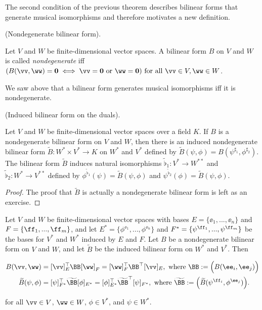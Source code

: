 The second condition of the previous theorem describes bilinear forms that generate musical isomorphisms and therefore motivates a new definition.

\begin{defn}
    (Nondegenerate bilinear form).
    
    Let $V$ and $W$ be finite-dimensional vector spaces. A bilinear form $B$ on $V$ and $W$ is called \textit{nondegenerate} iff $(B(\vv, \ww) = \mathbf{0} \iff \vv = \mathbf{0} \text{ or } \ww = \mathbf{0}) \text{ for all } \vv \in V, \ww \in W$.

    We saw above that a bilinear form generates musical isomorphisms iff it is nondegenerate.
\end{defn}

\begin{theorem}
\label{ch::bilinear_forms_metric_tensors::induced_bilinear_form_on_duals}
    (Induced bilinear form on the duals).
    
    Let $V$ and $W$ be finite-dimensional vector spaces over a field $K$. If $B$ is a nondegenerate bilinear form on $V$ and $W$, then there is an induced nondegenerate bilinear form $\widetilde{B}:W^* \times V^* \rightarrow K$ on $W^*$ and $V^*$ defined by $\widetilde{B}(\psi, \phi) = B(\psi^{\sharp_1}, \phi^{\sharp_2})$. The bilinear form $\widetilde{B}$ induces natural isomorphisms $\widetilde{\flat}_1:V^* \rightarrow W^{**}$ and $\widetilde{\flat}_2:W^* \rightarrow V^{**}$ defined by $\phi^{\widetilde{\flat}_1}(\psi) = \widetilde{B}(\psi, \phi)$ and $\psi^{\widetilde{\flat}_2}(\phi) = \widetilde{B}(\psi, \phi)$.
\end{theorem}

\begin{proof}
    The proof that $\widetilde{B}$ is actually a nondegenerate bilinear form is left as an exercise.
\end{proof}

\begin{lemma}
     Let $V$ and $W$ be finite-dimensional vector spaces with bases $E = \{\ee_1, ..., \ee_n\}$ and $F = \{\ff_1, ..., \ff_m\}$, and let $E^* = \{\phi^{\ee_1}, ..., \phi^{\ee_n}\}$ and $F^* = \{\psi^{\ff_1}, ..., \psi^{\ff_m}\}$ be the bases for $V^*$ and $W^*$ induced by $E$ and $F$. Let $B$ be a nondegenerate bilinear form on $V$ and $W$, and let $\widetilde{B}$ be the induced bilinear form on $W^*$ and $V^*$. Then 

    \begin{align*}
        B(\vv, \ww) &= [\vv]_E^\top \BB [\ww]_F = [\ww]_F^\top \BB^\top [\vv]_E, \text{ where $\BB := \Big(B(\ee_i, \ee_j)\Big)$}
        \\
        \widetilde{B}(\psi, \phi) &= [\psi]_{F^*}^\top \widetilde{\BB} [\phi]_{E^*} = [\phi]_{E^*}^\top \widetilde{\BB}^\top [\psi]_{F^*}, \text{ where $\widetilde{\BB} := \Big(\widetilde{B}(\psi^{\ff_i}, \phi^{\ee_j})\Big)$}.
    \end{align*}
    
    for all $\vv \in V$, $\ww \in W$, $\phi \in V^*$, and $\psi \in W^*$.
\end{lemma}

